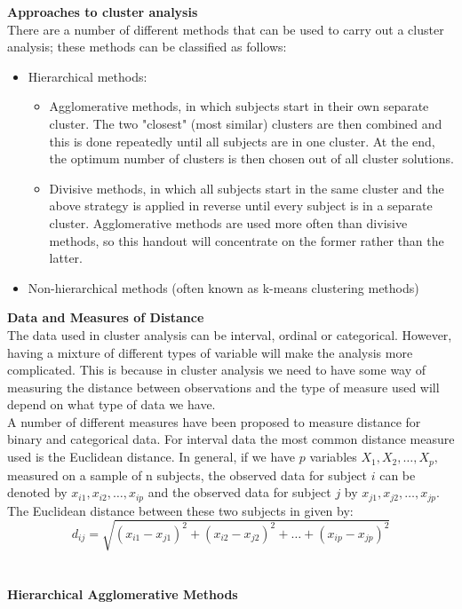 \textbf{\normalsize{Approaches to cluster analysis}}\\

There are a number of different methods that can be used to carry out a cluster analysis;
these methods can be classified as follows:
\begin{itemize}
\item Hierarchical methods:
\begin{itemize}
\item Agglomerative methods, in which subjects start in their own separate cluster. The
two "closest" (most similar) clusters are then combined and this is done repeatedly
until all subjects are in one cluster. At the end, the optimum number of clusters is
then chosen out of all cluster solutions.
\item Divisive methods, in which all subjects start in the same cluster and the above strategy is applied in reverse until every subject is in a separate cluster. Agglomerative methods are used more often than divisive methods, so this handout will
concentrate on the former rather than the latter.
\end{itemize}
\item Non-hierarchical methods (often known as k-means clustering methods)
\end{itemize}

\textbf{\normalsize{Data and Measures of Distance}}\\

The data used in cluster analysis can be interval, ordinal or categorical. However, having a mixture of different types of variable will make the analysis more complicated. This is because in cluster analysis we need to have some way of measuring the distance between observations
and the type of measure used will depend on what type of data we have.\\

A number of different measures have been proposed to measure distance for binary and categorical data. For interval data the most common distance measure used is the Euclidean distance. In general, if we have $p$ variables $X_{1},X_{2},\ldots,X_{p},$ measured on a sample of n subjects, the observed data for subject $i$ can be denoted by $x_{i1},x_{i2},\ldots,x_{ip}$ and the observed data for subject $j$ by $x_{j1},x_{j2},\ldots,x_{jp}$. The Euclidean distance between these two subjects in given by:\\
\begin{equation*}
d_{ij}=\sqrt{(x_{i1}-x_{j1})^{2}+(x_{i2}-x_{j2})^{2}+\ldots+(x_{ip}-x_{jp})^{2}}
\end{equation*} 
~\\ ~\\
\textbf{\normalsize{Hierarchical Agglomerative Methods}}\\

